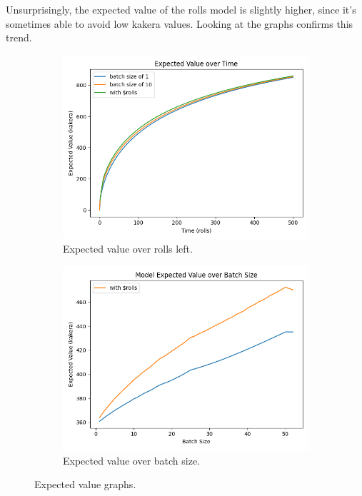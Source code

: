 \documentclass[11pt, oneside]{article}
\theoremstyle{plain}
\theoremstyle{definition}
\begin{document}
Unsurprisingly, the expected value of the rolls model is
slightly higher, since it's sometimes able to avoid low
kakera values. Looking at the graphs confirms this trend.
\begin{figure}[h!]
    \centering
    \begin{subfigure}[h]{0.45 \textwidth}
      \includegraphics[scale=0.4]{graphs/expected_value/model_rolls.png}
      \caption{Expected value over rolls left.}
    \end{subfigure}
    \begin{subfigure}[h]{0.45 \textwidth}
      \includegraphics[scale=0.4]{graphs/expected_value/batch_size_rolls.png}
      \caption{Expected value over batch size.}
    \end{subfigure}
    \caption{Expected value graphs.}
\end{figure}
\end{document}
